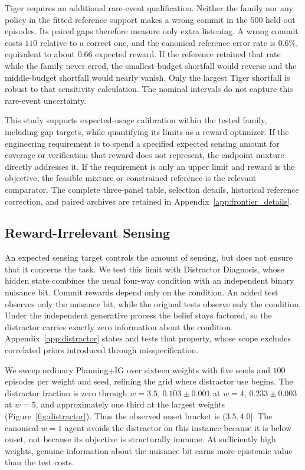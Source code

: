 Tiger requires an additional rare-event qualification. Neither the family nor any policy in the fitted reference support makes a wrong commit in the $500$ held-out episodes. Its paired gaps therefore measure only extra listening. A wrong commit costs $110$ relative to a correct one, and the canonical reference error rate is $0.6\%$, equivalent to about $0.66$ expected reward. If the reference retained that rate while the family never erred, the smallest-budget shortfall would reverse and the middle-budget shortfall would nearly vanish. Only the largest Tiger shortfall is robust to that sensitivity calculation. The nominal intervals do not capture this rare-event uncertainty.

This study supports expected-usage calibration within the tested family, including gap targets, while quantifying its limits as a reward optimizer. If the engineering requirement is to spend a specified expected sensing amount for coverage or verification that reward does not represent, the endpoint mixture directly addresses it. If the requirement is only an upper limit and reward is the objective, the feasible mixture or constrained reference is the relevant comparator. The complete three-panel table, selection details, historical reference correction, and paired archives are retained in Appendix~\ref{app:frontier_details}.

\subsection{Reward-Irrelevant Sensing}
\label{sec:distractor}

An expected sensing target controls the amount of sensing, but does not ensure that it concerns the task. We test this limit with Distractor Diagnosis, whose hidden state combines the usual four-way condition with an independent binary nuisance bit. Commit rewards depend only on the condition. An added test observes only the nuisance bit, while the original tests observe only the condition. Under the independent generative process the belief stays factored, so the distractor carries exactly zero information about the condition. Appendix~\ref{app:distractor} states and tests that property, whose scope excludes correlated priors introduced through misspecification.

We sweep ordinary Planning+IG over sixteen weights with five seeds and $100$ episodes per weight and seed, refining the grid where distractor use begins. The distractor fraction is zero through $w{=}3.5$, $0.103\pm0.001$ at $w{=}4$, $0.233\pm0.003$ at $w{=}5$, and approximately one third at the largest weights (Figure~\ref{fig:distractor}). Thus the observed onset bracket is $(3.5,4.0]$. The canonical $w{=}1$ agent avoids the distractor on this instance because it is below onset, not because its objective is structurally immune. At sufficiently high weights, genuine information about the nuisance bit earns more epistemic value than the test costs.

